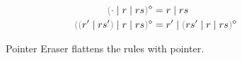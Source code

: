 
\begin{figure}[ht]

~~
\begin{subequations}\label{defn:rmpointer}
\begin{align}
  \rmpointer{\zruls{\cdot}{r}{rs}} &= \hrules{r}{rs} \\
  \rmpointer{\zruls{\hrulesP{r'}{rs'}}{r}{rs}} &= \hrules{r'}{\rmpointer{\zruls{rs'}{r}{rs}}}
\end{align}
\end{subequations}

\caption{Pointer Eraser flattens the rules with pointer.}
\label{fig:pointer-eraser}
\end{figure}
